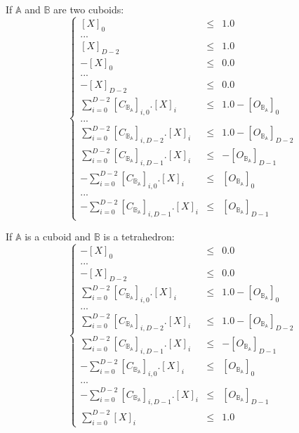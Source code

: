 \documentclass[12pt, a4paper]{article}
\begin{document}
If $\mathbb{A}$ and $\mathbb{B}$ are two cuboids:
\begin{equation}
\left\lbrace
\begin{array}{rcl}
\left[X\right]_0&\le&1.0\\
...\\
\left[X\right]_{D-2}&\le&1.0\\
-\left[X\right]_0&\le&0.0\\
...\\
-\left[X\right]_{D-2}&\le&0.0\\
\sum_{i=0}^{D-2}\left[C_{\mathbb{B}_\mathbb{A}}\right]_{i,0}.\left[X\right]_i&\le&1.0-\left[O_{\mathbb{B}_\mathbb{A}}\right]_0\\
...\\
\sum_{i=0}^{D-2}\left[C_{\mathbb{B}_\mathbb{A}}\right]_{i,D-2}.\left[X\right]_i&\le&1.0-\left[O_{\mathbb{B}_\mathbb{A}}\right]_{D-2}\\
\sum_{i=0}^{D-2}\left[C_{\mathbb{B}_\mathbb{A}}\right]_{i,D-1}.\left[X\right]_i&\le&-\left[O_{\mathbb{B}_\mathbb{A}}\right]_{D-1}\\
-\sum_{i=0}^{D-2}\left[C_{\mathbb{B}_\mathbb{A}}\right]_{i,0}.\left[X\right]_i&\le&\left[O_{\mathbb{B}_\mathbb{A}}\right]_0\\
...\\
-\sum_{i=0}^{D-2}\left[C_{\mathbb{B}_\mathbb{A}}\right]_{i,D-1}.\left[X\right]_i&\le&\left[O_{\mathbb{B}_\mathbb{A}}\right]_{D-1}
\end{array}
\right.
\end{equation}

If $\mathbb{A}$ is a cuboid and $\mathbb{B}$ is a tetrahedron:
\begin{equation}
\left\lbrace
\begin{array}{rcl}
-\left[X\right]_0&\le&0.0\\
...\\
-\left[X\right]_{D-2}&\le&0.0\\
\sum_{i=0}^{D-2}\left[C_{\mathbb{B}_\mathbb{A}}\right]_{i,0}.\left[X\right]_i&\le&1.0-\left[O_{\mathbb{B}_\mathbb{A}}\right]_0\\
...\\
\sum_{i=0}^{D-2}\left[C_{\mathbb{B}_\mathbb{A}}\right]_{i,D-2}.\left[X\right]_i&\le&1.0-\left[O_{\mathbb{B}_\mathbb{A}}\right]_{D-2}\\
\sum_{i=0}^{D-2}\left[C_{\mathbb{B}_\mathbb{A}}\right]_{i,D-1}.\left[X\right]_i&\le&-\left[O_{\mathbb{B}_\mathbb{A}}\right]_{D-1}\\
-\sum_{i=0}^{D-2}\left[C_{\mathbb{B}_\mathbb{A}}\right]_{i,0}.\left[X\right]_i&\le&\left[O_{\mathbb{B}_\mathbb{A}}\right]_0\\
...\\
-\sum_{i=0}^{D-2}\left[C_{\mathbb{B}_\mathbb{A}}\right]_{i,D-1}.\left[X\right]_i&\le&\left[O_{\mathbb{B}_\mathbb{A}}\right]_{D-1}\\
\sum_{i=0}^{D-2}\left[X\right]_i&\le&1.0
\end{array}
\right.
\end{equation}
\end{document}

